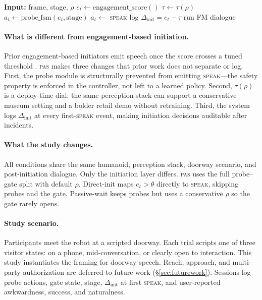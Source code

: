 \begin{algorithm}[h]
\caption{PAS initiation loop (10\,Hz)}
\small
\begin{algorithmic}[1]
\State \textbf{Input:} frame, stage, $\rho$
\State $e_t \leftarrow \text{engagement\_score}()$
\State $\tau \leftarrow \tau(\rho)$
\State $a_t \leftarrow \text{probe\_fsm}(e_t,\text{stage})$
  \State $a_t \leftarrow$ \textsc{speak}
  \State log $\Delta_{\text{init}} = e_t - \tau$
  \State run FM dialogue
\EndIf
\end{algorithmic}
\end{algorithm}

\paragraph{What is different from engagement-based initiation.}
Prior engagement-based initiators emit speech once the score crosses a
tuned threshold \citep{bohus2014,rich2010}. \textsc{pas} makes three
changes that prior work does not separate or log. First, the probe
module is structurally prevented from emitting \textsc{speak}---the
safety property is enforced in the controller, not left to a learned
policy. Second, $\tau(\rho)$ is a deploy-time dial: the same perception
stack can support a conservative museum setting and a bolder retail demo
without retraining. Third, the system logs $\Delta_{\text{init}}$ at
every first-\textsc{speak} event, making initiation decisions auditable
after incidents.

\paragraph{What the study changes.} All conditions share the same
humanoid, perception stack, doorway scenario, and post-initiation
dialogue. Only the initiation layer differs.
\textsc{pas} uses the full probe--gate split with default $\rho$.
Direct-init maps $e_t > \theta$ directly to \textsc{speak}, skipping
probes and the gate.
Passive-wait keeps probes but uses a conservative $\rho$ so the gate
rarely opens.

\paragraph{Study scenario.} Participants meet the robot at a scripted
doorway. Each trial scripts one of three visitor states: on a phone,
mid-conversation, or clearly open to interaction. This study
instantiates the framing for doorway speech. Reach, approach, and
multi-party authorization are deferred to future work (\S\ref{sec:futurework}).
Sessions log probe actions, gate state, stage, $\Delta_{\text{init}}$ at
first \textsc{speak}, and user-reported awkwardness, success, and
naturalness.

